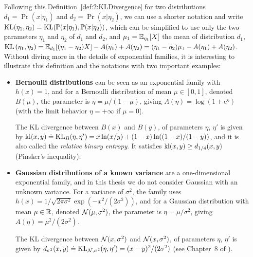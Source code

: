 Following this Definition~\ref{def:2:KLDivergence} for two distributions
$d_1=\Pr(x|\eta_1)$ and $d_2=\Pr(x|\eta_2)$,
we can use a shorter notation and write $\mathrm{KL}( \eta_1, \eta_2 ) \overset{.}{=} \mathrm{KL}(\mathbb{P}(x|\eta_1), \mathbb{P}(x|\eta_2))$, which can be simplified to use only the two parameters $\eta_1$ and $\eta_2$ of $d_1$ and $d_2$,
and $\mu_1 = \mathbb{E}_{\eta_1}[X]$ the mean of distribution $d_1$,
%
$\mathrm{KL}\left( \eta_1, \eta_2 \right) = \mathbb{E}_{d_1}[ (\eta_1 - \eta_2) X ] - A(\eta_1) + A(\eta_2) = (\eta_1 - \eta_2) \mu_1 - A(\eta_1) + A(\eta_2)$.
%
Without diving more in the details of exponential families,
it is interesting to illustrate this definition and the notations with two important examples:

\label{par:2:notationsExponentialFamiliesBernoulliGaussian}
\begin{itemize}
    \item
    \textbf{Bernoulli distributions} can be seen as an exponential family with $h(x) = 1$,
    and for a Bernoulli distribution of mean $\mu\in[0,1]$, denoted $B(\mu)$,
    the parameter is $\eta = \mu / (1 - \mu)$, giving $A(\eta) = \log(1 + \mathrm{e}^{\eta})$
    (with the limit behavior $\eta=+\infty$ if $\mu=0$).

    The KL divergence between $B(x)$ and $B(y)$, of parameters $\eta$, $\eta'$ is given by
    $\mathrm{kl}(x,y) \overset{.}{=} \mathrm{KL}_{B}(\eta,\eta') = x \ln(x/y) + (1-x) \ln((1-x)/(1-y))$,
    and it is also called the \emph{relative binary entropy}.
    It satisfies $\mathrm{kl}(x,y) \geq d_{1/4}(x,y)$ (Pinsker's inequality).

    \item
    \textbf{Gaussian distributions of a known variance} are a one-dimensional exponential family,
    and in this thesis we do not consider Gaussian with an unknown variance.
    For a variance of $\sigma^2$, the family uses
    $h(x) = 1/\sqrt{2\pi\sigma^2} \exp(-x^2/(2\sigma^2))$,
    and for a Gaussian distribution with mean $\mu\in\mathbb{R}$, denoted $\mathcal{N}(\mu,\sigma^2)$,
    the parameter is $\eta = \mu/\sigma^2$, giving $A(\eta) = \mu^2/(2\sigma^2)$.

    The KL divergence between $\mathcal{N}(x,\sigma^2)$ and $\mathcal{N}(x,\sigma^2)$, of parameters $\eta$, $\eta'$ is given by
    $d_{\sigma^2}(x,y) \overset{.}{=} \mathrm{KL}_{\mathcal{N},\sigma^2}(\eta,\eta') = (x-y)^2 / (2\sigma^2)$
    (see Chapter~8 of \cite{JordanCourseStatBerkeley}).
\end{itemize}


